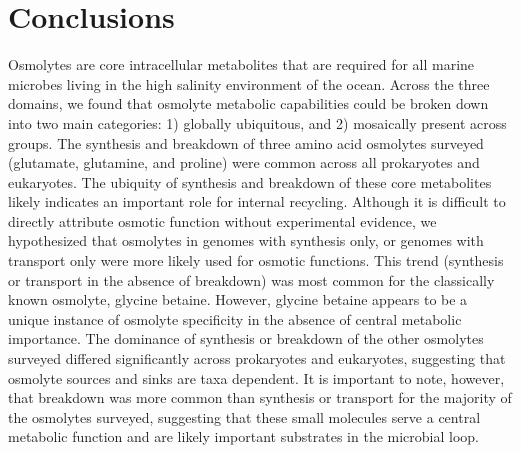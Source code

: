 \documentclass[utf8]{frontiersSCNS} %
\begin{document}
\section{Conclusions}

Osmolytes are core intracellular metabolites that are required for all marine microbes living in the high salinity environment of the ocean. Across the three domains, we found that osmolyte metabolic capabilities could be broken down into two main categories: 1) globally ubiquitous, and 2) mosaically present across groups. The synthesis and breakdown of three amino acid osmolytes surveyed (glutamate, glutamine, and proline) were common across all prokaryotes and eukaryotes. The ubiquity of synthesis and breakdown of these core metabolites likely indicates an important role for internal recycling. Although it is difficult to directly attribute osmotic function without experimental evidence, we hypothesized that osmolytes in genomes with synthesis only, or genomes with transport only were more likely used for osmotic functions. This trend (synthesis or transport in the absence of breakdown) was most common for the classically known osmolyte, glycine betaine. However, glycine betaine appears to be a unique instance of osmolyte specificity in the absence of central metabolic importance. The dominance of synthesis or breakdown of the other osmolytes surveyed differed significantly across prokaryotes and eukaryotes, suggesting that osmolyte sources and sinks are taxa dependent.  It is important to note, however, that breakdown was more common than synthesis or transport for the majority of the osmolytes surveyed, suggesting that these small molecules serve a central metabolic function and are likely important substrates in the microbial loop.
\end{document}
